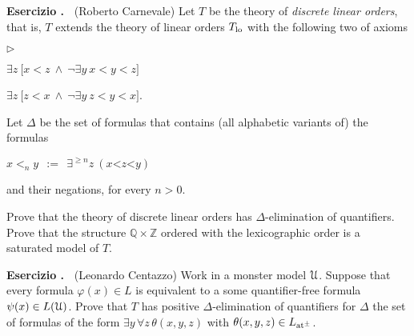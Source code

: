 \documentclass[10pt]{article}
\def\phi{\varphi}
\def\U{\EuScript U}
\def\ZZ{\mathds Z}
\def\QQ{\mathds Q}
\def\E{\exists}
\def\A{\forall}
\newcommand{\labella}[1]{{\sf\footnotesize #1}\hfill}
\renewenvironment{itemize}
  {\begin{list}{$\triangleright$}{%
   \setlength{\parskip}{0mm}
   \setlength{\topsep}{0mm}
   \setlength{\rightmargin}{0mm}
   \setlength{\listparindent}{0mm}
   \setlength{\itemindent}{0mm}
   \setlength{\labelwidth}{3ex}
   \setlength{\itemsep}{0mm}
   \setlength{\parsep}{0mm}
   \setlength{\partopsep}{0mm}
   \setlength{\labelsep}{1ex}
   \setlength{\leftmargin}{\labelwidth+\labelsep}
   \let\makelabel\labella}}{%
   \vspace*{-.3\baselineskip}
  \end{list}}
\newcounter{ex}
\newenvironment{exercise}{\bigskip\addtocounter{ex}{1}\textbf{Esercizio \theex.\ }}{}
\begin{document}
\begin{exercise}
  (Roberto Carnevale)
  Let $T$ be the theory of \emph{discrete linear orders}, that is, $T$ extends the theory of linear orders $T_{\rm lo}$ with the following two of axioms
  \begin{itemize}
  \item[dis$\uparrow$.] $\E z\ \big[x<z\ \wedge\ \neg\E y\ x<y<z\big]$
  \item[dis$\downarrow$.] $\E z\ \big[ z<x\ \wedge\ \neg\E y\ z<y<x\big]$.
  \end{itemize}
  Let $\Delta$ be the set of formulas that contains (all alphabetic variants of) the formulas 

  \hfil $x<_ny\ \ :=\ \ \E^{\ge n}z\ (x\mathord<z\mathord< y)$ 

  and their negations, for every $n>0$.

  Prove that the theory of discrete linear orders has $\Delta$-elimination of quantifiers.
  Prove that the structure $\QQ\times\ZZ$ ordered with the lexicographic order is a saturated model of $T$.
\end{exercise}

\begin{exercise}
  (Leonardo Centazzo)
  Work in a monster model $\U$.
  Suppose that every formula $\phi(x)\in L$ is equivalent to a some quantifier-free formula $\psi(x)\in L(\U)$.
  Prove that $T$ has positive $\Delta$-elimination of quantifiers for $\Delta$ the set of formulas of the form $\E y\,\A z\,\theta(x,y,z)$ with $\theta(x,y,z)\in L_{\rm at^\pm}$.
\end{exercise}


\end{document}
